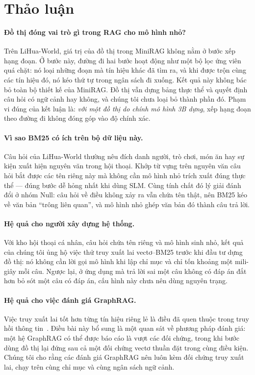 \section{Thảo luận}\label{sec:discussion}

\paragraph{Đồ thị đóng vai trò gì trong RAG cho mô hình nhỏ?}
Trên LiHua-World, giá trị của đồ thị trong MiniRAG không nằm ở bước xếp hạng đoạn.
Ở bước này, đường đi hai bước hoạt động như một bộ lọc ứng viên quá chặt: nó loại những đoạn mà tín hiệu khác đã tìm ra, và khi được trộn cùng các tín hiệu đó, nó kéo thứ tự trong ngân sách đi xuống.
Kết quả này không bác bỏ toàn bộ thiết kế của MiniRAG.
Đồ thị vẫn dựng bảng thực thể và quyết định câu hỏi có ngữ cảnh hay không, và chúng tôi chưa loại bỏ thành phần đó.
Phạm vi đúng của kết luận là: \emph{với một đồ thị do chính mô hình 3B dựng}, xếp hạng đoạn theo đường đi không đóng góp vào độ chính xác.

\paragraph{Vì sao BM25 có ích trên bộ dữ liệu này.}
Câu hỏi của LiHua-World thường nêu đích danh người, trò chơi, món ăn hay sự kiện xuất hiện nguyên văn trong hội thoại.
Khớp từ vựng trên nguyên văn câu hỏi bắt được các tên riêng này mà không cần mô hình nhỏ trích xuất đúng thực thể --- đúng bước dễ hỏng nhất khi dùng SLM.
Cùng tính chất đó lý giải đánh đổi ở nhóm Null: câu hỏi về điều không xảy ra vẫn chứa tên thật, nên BM25 kéo về văn bản ``trông liên quan'', và mô hình nhỏ ghép văn bản đó thành câu trả lời.

\paragraph{Hệ quả cho người xây dựng hệ thống.}
Với kho hội thoại cá nhân, câu hỏi chứa tên riêng và mô hình sinh nhỏ, kết quả của chúng tôi ủng hộ việc thử truy xuất lai vectơ--BM25 trước khi đầu tư dựng đồ thị: nó không cần lời gọi mô hình khi lập chỉ mục và chỉ tốn khoảng một mili-giây mỗi câu.
Ngược lại, ở ứng dụng mà trả lời sai một câu không có đáp án đắt hơn bỏ sót một câu có đáp án, cấu hình này chưa nên dùng nguyên trạng.

\paragraph{Hệ quả cho việc đánh giá GraphRAG.}
Việc truy xuất lai tốt hơn từng tín hiệu riêng lẻ là điều đã quen thuộc trong truy hồi thông tin~\cite{cormack2009rrf}.
Điều bài này bổ sung là một quan sát về phương pháp đánh giá: một hệ GraphRAG có thể được báo cáo là vượt các đối chứng, trong khi bước dùng đồ thị lại đứng sau cả một đối chứng vectơ thuần đặt trong cùng điều kiện.
Chúng tôi cho rằng các đánh giá GraphRAG nên luôn kèm đối chứng truy xuất lai, chạy trên cùng chỉ mục và cùng ngân sách ngữ cảnh.
